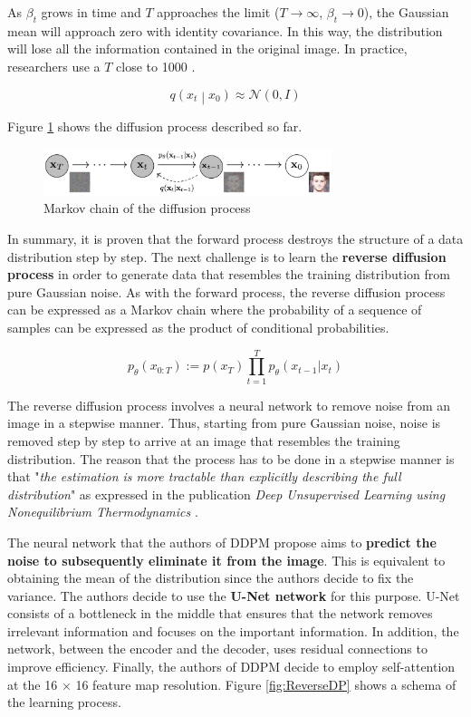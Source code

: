 As $\beta_t$ grows in time and $T$ approaches the limit ($T \rightarrow\infty$, $\beta_t \rightarrow 0$), the Gaussian mean will approach zero with identity covariance. In this way, the distribution will lose all the information contained in the original image. In practice, researchers use a $T$ close to 1000 \cite{ho2020denoising}.

\[q\left(x_t\middle| x_0\right)\approx\mathcal{N}\left(0,I\right)\]

Figure \ref{fig:MarkovchainDP} shows the diffusion process described so far.

\begin{figure}
    \centering
    \includegraphics[width=0.75\textwidth]{Pictures/MarkovchainDP} 
    \caption{Markov chain of the diffusion process \cite{ho2020denoising}}
    \label{fig:MarkovchainDP}
\end{figure}

In summary, it is proven that the forward process destroys the structure of a data distribution step by step. The next challenge is to learn the \textbf{reverse diffusion process} in order to generate data that resembles the training distribution from pure Gaussian noise. As with the forward process, the reverse diffusion process can be expressed as a Markov chain where the probability of a sequence of samples can be expressed as the product of conditional probabilities.

\[ p_\theta\left(x_{0:T}\right) := p\left ( x_T \right ) \prod_{t=1}^{T}p_\theta\left ( x_{t-1} | x_t\right ) \]

The reverse diffusion process involves a neural network to remove noise from an image in a stepwise manner. Thus, starting from pure Gaussian noise, noise is removed step by step to arrive at an image that resembles the training distribution. The reason that the process has to be done in a stepwise manner is that "\textit{the estimation is more tractable than explicitly describing the full distribution}" as expressed in the publication \textit{Deep Unsupervised Learning using Nonequilibrium Thermodynamics} \cite{sohl2015deep}.

The neural network that the authors of DDPM propose aims to \textbf{predict the noise to subsequently eliminate it from the image}. This is equivalent to obtaining the mean of the distribution since the authors decide to fix the variance. The authors decide to use the \textbf{U-Net network} \cite{ronneberger2015u} for this purpose. U-Net consists of a bottleneck in the middle that ensures that the network removes irrelevant information and focuses on the important information. In addition, the network, between the encoder and the decoder, uses residual connections to improve efficiency. Finally, the authors of DDPM decide to employ self-attention at the 16 × 16 feature map resolution. Figure \ref{fig:ReverseDP} shows a schema of the learning process.

